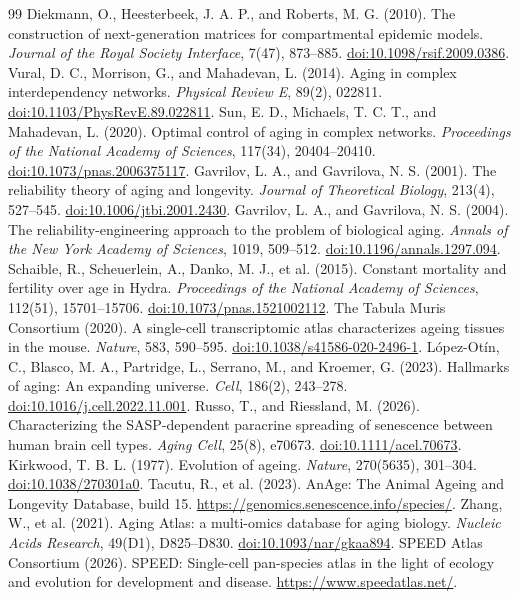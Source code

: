 \documentclass[11pt,a4paper]{article}
\begin{document}
\begin{thebibliography}{99}
 Diekmann, O., Heesterbeek, J. A. P., and Roberts, M. G. (2010). The construction of next-generation matrices for compartmental epidemic models. \emph{Journal of the Royal Society Interface}, 7(47), 873--885. \href{https://doi.org/10.1098/rsif.2009.0386}{doi:10.1098/rsif.2009.0386}.
 Vural, D. C., Morrison, G., and Mahadevan, L. (2014). Aging in complex interdependency networks. \emph{Physical Review E}, 89(2), 022811. \href{https://doi.org/10.1103/PhysRevE.89.022811}{doi:10.1103/PhysRevE.89.022811}.
 Sun, E. D., Michaels, T. C. T., and Mahadevan, L. (2020). Optimal control of aging in complex networks. \emph{Proceedings of the National Academy of Sciences}, 117(34), 20404--20410. \href{https://doi.org/10.1073/pnas.2006375117}{doi:10.1073/pnas.2006375117}.
 Gavrilov, L. A., and Gavrilova, N. S. (2001). The reliability theory of aging and longevity. \emph{Journal of Theoretical Biology}, 213(4), 527--545. \href{https://doi.org/10.1006/jtbi.2001.2430}{doi:10.1006/jtbi.2001.2430}.
 Gavrilov, L. A., and Gavrilova, N. S. (2004). The reliability-engineering approach to the problem of biological aging. \emph{Annals of the New York Academy of Sciences}, 1019, 509--512. \href{https://doi.org/10.1196/annals.1297.094}{doi:10.1196/annals.1297.094}.
 Schaible, R., Scheuerlein, A., Danko, M. J., et al. (2015). Constant mortality and fertility over age in Hydra. \emph{Proceedings of the National Academy of Sciences}, 112(51), 15701--15706. \href{https://doi.org/10.1073/pnas.1521002112}{doi:10.1073/pnas.1521002112}.
 The Tabula Muris Consortium (2020). A single-cell transcriptomic atlas characterizes ageing tissues in the mouse. \emph{Nature}, 583, 590--595. \href{https://doi.org/10.1038/s41586-020-2496-1}{doi:10.1038/s41586-020-2496-1}.
 L\'{o}pez-Ot\'{i}n, C., Blasco, M. A., Partridge, L., Serrano, M., and Kroemer, G. (2023). Hallmarks of aging: An expanding universe. \emph{Cell}, 186(2), 243--278. \href{https://doi.org/10.1016/j.cell.2022.11.001}{doi:10.1016/j.cell.2022.11.001}.
 Russo, T., and Riessland, M. (2026). Characterizing the SASP-dependent paracrine spreading of senescence between human brain cell types. \emph{Aging Cell}, 25(8), e70673. \href{https://doi.org/10.1111/acel.70673}{doi:10.1111/acel.70673}.
 Kirkwood, T. B. L. (1977). Evolution of ageing. \emph{Nature}, 270(5635), 301--304. \href{https://doi.org/10.1038/270301a0}{doi:10.1038/270301a0}.
 Tacutu, R., et al. (2023). AnAge: The Animal Ageing and Longevity Database, build 15. \url{https://genomics.senescence.info/species/}.
 Zhang, W., et al. (2021). Aging Atlas: a multi-omics database for aging biology. \emph{Nucleic Acids Research}, 49(D1), D825--D830. \href{https://doi.org/10.1093/nar/gkaa894}{doi:10.1093/nar/gkaa894}.
 SPEED Atlas Consortium (2026). SPEED: Single-cell pan-species atlas in the light of ecology and evolution for development and disease. \url{https://www.speedatlas.net/}.
\end{thebibliography}
\end{document}
